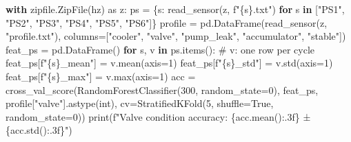 \documentclass[
  letterpaper,
  DIV=11,
  numbers=noendperiod]{scrreprt}
\newenvironment{Shaded}{\begin{snugshade}}{\end{snugshade}}
\newcommand{\BuiltInTok}[1]{\textcolor[rgb]{0.00,0.23,0.31}{#1}}
\newcommand{\CommentTok}[1]{\textcolor[rgb]{0.37,0.37,0.37}{#1}}
\newcommand{\ControlFlowTok}[1]{\textcolor[rgb]{0.00,0.23,0.31}{\textbf{#1}}}
\newcommand{\DecValTok}[1]{\textcolor[rgb]{0.68,0.00,0.00}{#1}}
\newcommand{\ImportTok}[1]{\textcolor[rgb]{0.00,0.46,0.62}{#1}}
\newcommand{\KeywordTok}[1]{\textcolor[rgb]{0.00,0.23,0.31}{\textbf{#1}}}
\newcommand{\NormalTok}[1]{\textcolor[rgb]{0.00,0.23,0.31}{#1}}
\newcommand{\OperatorTok}[1]{\textcolor[rgb]{0.37,0.37,0.37}{#1}}
\newcommand{\SpecialCharTok}[1]{\textcolor[rgb]{0.37,0.37,0.37}{#1}}
\newcommand{\SpecialStringTok}[1]{\textcolor[rgb]{0.13,0.47,0.30}{#1}}
\newcommand{\StringTok}[1]{\textcolor[rgb]{0.13,0.47,0.30}{#1}}
\newcommand{\VariableTok}[1]{\textcolor[rgb]{0.07,0.07,0.07}{#1}}
\begin{document}
\begin{tcolorbox}
\begin{Shaded}
\begin{Highlighting}[]
\ControlFlowTok{with}\NormalTok{ zipfile.ZipFile(hz) }\ImportTok{as}\NormalTok{ z:}
\NormalTok{    ps }\OperatorTok{=}\NormalTok{ \{s: read\_sensor(z, }\SpecialStringTok{f"}\SpecialCharTok{\{}\NormalTok{s}\SpecialCharTok{\}}\SpecialStringTok{.txt"}\NormalTok{) }\ControlFlowTok{for}\NormalTok{ s }\KeywordTok{in}\NormalTok{ [}\StringTok{"PS1"}\NormalTok{, }\StringTok{"PS2"}\NormalTok{, }\StringTok{"PS3"}\NormalTok{, }\StringTok{"PS4"}\NormalTok{, }\StringTok{"PS5"}\NormalTok{, }\StringTok{"PS6"}\NormalTok{]\}}
\NormalTok{    profile }\OperatorTok{=}\NormalTok{ pd.DataFrame(read\_sensor(z, }\StringTok{"profile.txt"}\NormalTok{),}
\NormalTok{                           columns}\OperatorTok{=}\NormalTok{[}\StringTok{"cooler"}\NormalTok{, }\StringTok{"valve"}\NormalTok{, }\StringTok{"pump\_leak"}\NormalTok{, }\StringTok{"accumulator"}\NormalTok{, }\StringTok{"stable"}\NormalTok{])}
\NormalTok{feat\_ps }\OperatorTok{=}\NormalTok{ pd.DataFrame()}
\ControlFlowTok{for}\NormalTok{ s, v }\KeywordTok{in}\NormalTok{ ps.items():                            }\CommentTok{\# v: one row per cycle}
\NormalTok{    feat\_ps[}\SpecialStringTok{f"}\SpecialCharTok{\{}\NormalTok{s}\SpecialCharTok{\}}\SpecialStringTok{\_mean"}\NormalTok{] }\OperatorTok{=}\NormalTok{ v.mean(axis}\OperatorTok{=}\DecValTok{1}\NormalTok{)}
\NormalTok{    feat\_ps[}\SpecialStringTok{f"}\SpecialCharTok{\{}\NormalTok{s}\SpecialCharTok{\}}\SpecialStringTok{\_std"}\NormalTok{] }\OperatorTok{=}\NormalTok{ v.std(axis}\OperatorTok{=}\DecValTok{1}\NormalTok{)}
\NormalTok{    feat\_ps[}\SpecialStringTok{f"}\SpecialCharTok{\{}\NormalTok{s}\SpecialCharTok{\}}\SpecialStringTok{\_max"}\NormalTok{] }\OperatorTok{=}\NormalTok{ v.}\BuiltInTok{max}\NormalTok{(axis}\OperatorTok{=}\DecValTok{1}\NormalTok{)}
\NormalTok{acc }\OperatorTok{=}\NormalTok{ cross\_val\_score(RandomForestClassifier(}\DecValTok{300}\NormalTok{, random\_state}\OperatorTok{=}\DecValTok{0}\NormalTok{), feat\_ps, profile[}\StringTok{"valve"}\NormalTok{].astype(}\BuiltInTok{int}\NormalTok{),}
\NormalTok{                      cv}\OperatorTok{=}\NormalTok{StratifiedKFold(}\DecValTok{5}\NormalTok{, shuffle}\OperatorTok{=}\VariableTok{True}\NormalTok{, random\_state}\OperatorTok{=}\DecValTok{0}\NormalTok{))}
\BuiltInTok{print}\NormalTok{(}\SpecialStringTok{f"Valve condition accuracy: }\SpecialCharTok{\{}\NormalTok{acc}\SpecialCharTok{.}\NormalTok{mean()}\SpecialCharTok{:.3f\}}\SpecialStringTok{ ± }\SpecialCharTok{\{}\NormalTok{acc}\SpecialCharTok{.}\NormalTok{std()}\SpecialCharTok{:.3f\}}\SpecialStringTok{"}\NormalTok{)}
\end{Highlighting}
\end{Shaded}


\end{tcolorbox}
\end{document}
